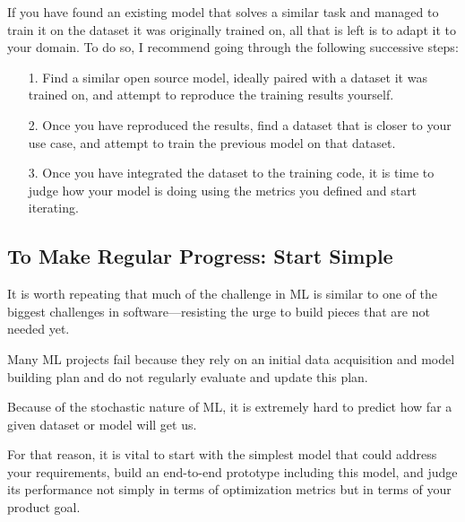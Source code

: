 If you have found an existing model that solves a similar task and managed to train it
on the dataset it was originally trained on, all that is left is to adapt it to your domain.
To do so, I recommend going through the following successive steps:
\begin{enumerate}
    \item[1.] Find a similar open source model, ideally paired with a dataset it was trained on,
    and attempt to reproduce the training results yourself.

    \item[2.] Once you have reproduced the results, find a dataset that is closer to your use
    case, and attempt to train the previous model on that dataset.

    \item[3.] Once you have integrated the dataset to the training code, it is time to judge how
    your model is doing using the metrics you defined and start iterating.
\end{enumerate}



\subsection{To Make Regular Progress: Start Simple}
It is worth repeating that much of the challenge in ML is similar to one
of the biggest challenges in software—resisting the urge to build pieces
that are not needed yet.

Many ML projects fail because they rely on an initial data acquisition and
model building plan and do not regularly evaluate and update this plan.

Because of the stochastic nature of ML, it is extremely hard to predict how
far a given dataset or model will get us.

For that reason, it is vital to start with the simplest model that could
address your requirements, build an end-to-end prototype including this
model, and judge its performance not simply in terms of optimization metrics
but in terms of your product goal.

